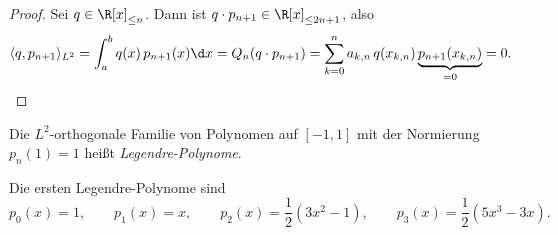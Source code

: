 \documentclass[11pt]{article}
\begin{document}
\begin{proof}
  Sei $q \in \R[x]_{\le n}$. Dann ist $q \cdot p_{n+1} \in \R[x]_{\le 2n+1}$, also
  \[ \langle q, p_{n+1} \rangle_{L^2} = \int_a^b q(x)\, p_{n+1}(x) \d x = Q_n(q \cdot p_{n+1}) = \sum_{k=0}^{n} a_{k,n}\, q(x_{k,n}) \underbrace{p_{n+1}(x_{k,n})}_{= 0} = 0. \qedhere \]
\end{proof}

\begin{definition}\Theorem
  Die $L^2$-orthogonale Familie von Polynomen auf $[-1, 1]$ mit der Normierung $p_n(1) = 1$ heißt \emph{Legendre-Polynome}.
\end{definition}

\begin{example}
  Die ersten Legendre-Polynome sind
  \[ p_0(x) = 1, \qquad p_1(x) = x, \qquad p_2(x) = \frac{1}{2}(3x^2 - 1), \qquad p_3(x) = \frac{1}{2}(5x^3 - 3x). \]
\end{example}




\PropertyNotice
\end{document}
